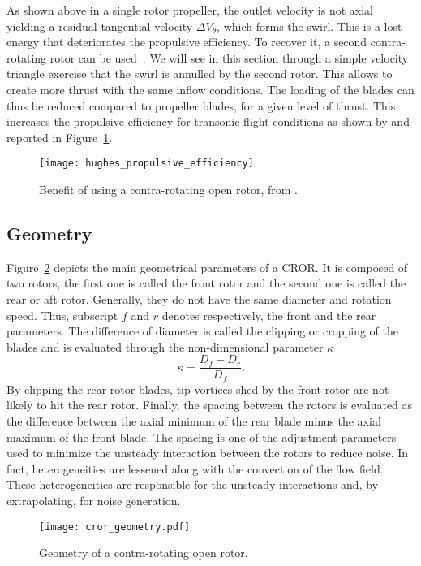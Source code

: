 
As shown above in a single rotor propeller, the outlet velocity is not axial
yielding a residual tangential velocity $\Delta V_{\theta}$,
which forms the swirl. 
This is a lost energy that deteriorates the propulsive efficiency. 
To recover it, a second contra-rotating rotor can be used~\cite{Hager1988}.
We will see in this section through a simple velocity triangle exercise that
the swirl is annulled by the second rotor. 
This allows to create more thrust with the same inflow conditions.
The loading of the blades can thus be reduced compared
to propeller blades, for a given level of thrust.
This increases the propulsive
efficiency for transonic flight conditions
as shown by \citet{Hughes1989} and reported 
in Figure~\ref{fig:hughes_propulsive_efficiency}.
\begin{figure}[htp]
  \centering
  \texttt{[image: hughes\_propulsive\_efficiency]}
  \caption{Benefit of using a contra-rotating open rotor, from \citet{Hughes1989}.}
  \label{fig:hughes_propulsive_efficiency}
\end{figure}

\subsection{Geometry}
\label{sub:cror_geometry}

Figure~\ref{fig:cror_geometry} depicts the main
geometrical parameters of a CROR.
It is composed of two rotors, the first one is called
the front rotor and the second one is called the rear or aft rotor.
Generally, they do not have the same diameter and rotation speed. 
Thus, subscript $f$ and $r$ denotes respectively,
the front and the rear parameters.
The difference of diameter is called the clipping or cropping
of the blades and is evaluated through the non-dimensional parameter
$\kappa$
\begin{equation}
    \kappa = \frac{D_f - D_r}{D_f}.
\end{equation}
By clipping the rear rotor blades, 
tip vortices shed by the front rotor are not likely
to hit the rear rotor.
Finally, the spacing between the rotors
is evaluated as the difference between the axial minimum of the
rear blade minus the axial maximum of the front blade. The spacing
is one of the adjustment parameters used to minimize the unsteady
interaction between the rotors to reduce noise. In fact, 
heterogeneities are lessened along with the convection of
the flow field. These heterogeneities are responsible
for the unsteady interactions and, by extrapolating, for noise generation.
\begin{figure}[htp]
  \centering
  \texttt{[image: cror\_geometry.pdf]}
  \caption{Geometry of a contra-rotating open rotor.}
  \label{fig:cror_geometry}
\end{figure}

